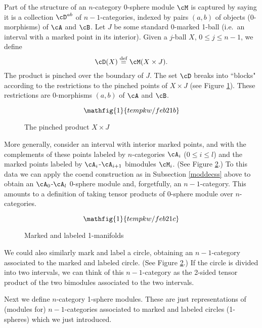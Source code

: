 \medskip

Part of the structure of an $n$-category 0-sphere module $\cM$  is captured by saying it is
a collection $\cD^{ab}$ of $n{-}1$-categories, indexed by pairs $(a, b)$ of objects (0-morphisms)
of $\cA$ and $\cB$.
Let $J$ be some standard 0-marked 1-ball (i.e.\ an interval with a marked point in its interior).
Given a $j$-ball $X$, $0\le j\le n-1$, we define
\[
	\cD(X) \deq \cM(X\times J) .
\]
The product is pinched over the boundary of $J$.
The set $\cD$ breaks into ``blocks" according to the restrictions to the pinched points of $X\times J$
(see Figure \ref{feb21b}).
These restrictions are 0-morphisms $(a, b)$ of $\cA$ and $\cB$.

\begin{figure}[!ht]
\begin{equation*}
\mathfig{1}{tempkw/feb21b}
\end{equation*}
\caption{The pinched product $X\times J$}
\label{feb21b}
\end{figure}

More generally, consider an interval with interior marked points, and with the complements
of these points labeled by $n$-categories $\cA_i$ ($0\le i\le l$) and the marked points labeled
by $\cA_i$-$\cA_{i+1}$ bimodules $\cM_i$.
(See Figure \ref{feb21c}.)
To this data we can apply the coend construction as in Subsection \ref{moddecss} above
to obtain an $\cA_0$-$\cA_l$ $0$-sphere module and, forgetfully, an $n{-}1$-category.
This amounts to a definition of taking tensor products of $0$-sphere module over $n$-categories.

\begin{figure}[!ht]
\begin{equation*}
\mathfig{1}{tempkw/feb21c}
\end{equation*}
\caption{Marked and labeled 1-manifolds}
\label{feb21c}
\end{figure}

We could also similarly mark and label a circle, obtaining an $n{-}1$-category
associated to the marked and labeled circle.
(See Figure \ref{feb21c}.)
If the circle is divided into two intervals, we can think of this $n{-}1$-category
as the 2-sided tensor product of the two bimodules associated to the two intervals.

\medskip

Next we define $n$-category 1-sphere modules.
These are just representations of (modules for) $n{-}1$-categories associated to marked and labeled 
circles (1-spheres) which we just introduced.

